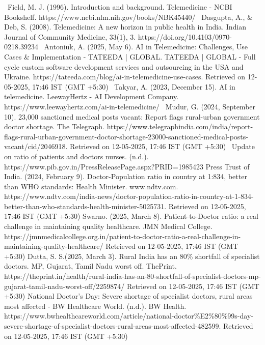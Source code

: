 \begin{thebibliography}{}


~Field, M. J. (1996). Introduction and background. Telemedicine - NCBI Bookshelf. https://www.ncbi.nlm.nih.gov/books/NBK45440/
~Dasgupta, A., \& Deb, S. (2008). Telemedicine: A new horizon in public health in India. Indian Journal of Community Medicine, 33(1), 3. https://doi.org/10.4103/0970-0218.39234
~Antoniuk, A. (2025, May 6). AI in Telemedicine: Challenges, Use Cases \& Implementation - TATEEDA | GLOBAL. TATEEDA | GLOBAL - Full cycle custom software development services and outsourcing in the USA and Ukraine. https://tateeda.com/blog/ai-in-telemedicine-use-cases. Retrieved on 12-05-2025, 17:46 IST (GMT +5:30)
~Takyar, A. (2023, December 15). AI in telemedicine. LeewayHertz - AI Development Company. https://www.leewayhertz.com/ai-in-telemedicine/
~Mudur, G. (2024, September 10). 23,000 sanctioned medical posts vacant: Report flags rural-urban government doctor shortage. The Telegraph. https://www.telegraphindia.com/india/report-flags-rural-urban-government-doctor-shortage-23000-sanctioned-medical-posts-vacant/cid/2046918. Retrieved on 12-05-2025, 17:46 IST (GMT +5:30)
~Update on ratio of patients and doctors nurses. (n.d.). https://www.pib.gov.in/PressReleasePage.aspx?PRID=1985423
Press Trust of India. (2024, February 9). Doctor-Population ratio in country at 1:834, better than WHO standards: Health Minister. www.ndtv.com. https://www.ndtv.com/india-news/doctor-population-ratio-in-country-at-1-834-better-than-who-standards-health-minister-5025731. Retrieved on 12-05-2025, 17:46 IST (GMT +5:30)
Swarno. (2025, March 8). Patient-to-Doctor ratio: a real challenge in maintaining quality healthcare. JMN Medical College. https://jmnmedicalcollege.org.in/patient-to-doctor-ratio-a-real-challenge-in-maintaining-quality-healthcare/ Retrieved on 12-05-2025, 17:46 IST (GMT +5:30)
Dutta, S. S.(2025, March 3). Rural India has an 80\% shortfall of specialist doctors. MP, Gujarat, Tamil Nadu worst off. ThePrint. https://theprint.in/health/rural-india-has-an-80-shortfall-of-specialist-doctors-mp-gujarat-tamil-nadu-worst-off/2259874/ Retrieved on 12-05-2025, 17:46 IST (GMT +5:30)
National Doctor’s Day: Severe shortage of specialist doctors, rural areas most affected - BW Healthcare World. (n.d.). BW Health. https://www.bwhealthcareworld.com/article/national-doctor\%E2\%80\%99s-day-severe-shortage-of-specialist-doctors-rural-areas-most-affected-482599. Retrieved on 12-05-2025, 17:46 IST (GMT +5:30)


\end{thebibliography}
